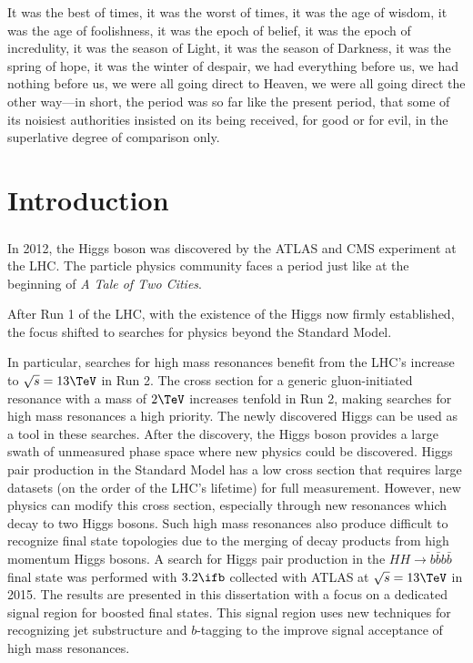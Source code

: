 \begin{savequote}[75mm]
It was the best of times, it was the worst of times, it was the age of wisdom, it was the age of foolishness, it was the epoch of belief, it was the epoch of incredulity, it was the season of Light, it was the season of Darkness, it was the spring of hope, it was the winter of despair, we had everything before us, we had nothing before us, we were all going direct to Heaven, we were all going direct the other way—in short, the period was so far like the present period, that some of its noisiest authorities insisted on its being received, for good or for evil, in the superlative degree of comparison only.
\end{savequote}

\chapter{Introduction}
\label{introduction}

\paragraph{}
In 2012, the Higgs boson was discovered by the ATLAS and CMS experiment at the LHC. The particle physics community faces a period just like at the beginning of \textit{A Tale of Two Cities}. 


After Run 1 of the LHC, with the existence of the Higgs now firmly established, the focus shifted to searches for physics beyond the Standard Model.


In particular, searches for high mass resonances benefit from the LHC's increase to $\sqrt{s} = 13 \TeV$ in Run 2. 
The cross section for a generic gluon-initiated resonance with a mass of $2 \TeV$ increases tenfold in Run 2, making searches for high mass resonances a high priority. 
The newly discovered Higgs can be used as a tool in these searches. 
After the discovery, the Higgs boson provides a large swath of unmeasured phase space where new physics could be discovered. 
Higgs pair production in the Standard Model has a low cross section that requires large datasets (on the order of the LHC's lifetime) for full measurement. 
However, new physics can modify this cross section, especially through new resonances which decay to two Higgs bosons. 
Such high mass resonances also produce difficult to recognize final state topologies due to the merging of decay products from high momentum Higgs bosons. 
A search for Higgs pair production in the $HH\to b\bar{b}b\bar{b}$ final state was performed with $3.2 \ifb$ collected with ATLAS at $\sqrt{s} = 13 \TeV$ in 2015. 
The results are presented in this dissertation with a focus on a dedicated signal region for boosted final states. 
This signal region uses new techniques for recognizing jet substructure and $b$-tagging to the improve signal acceptance of high mass resonances. 



